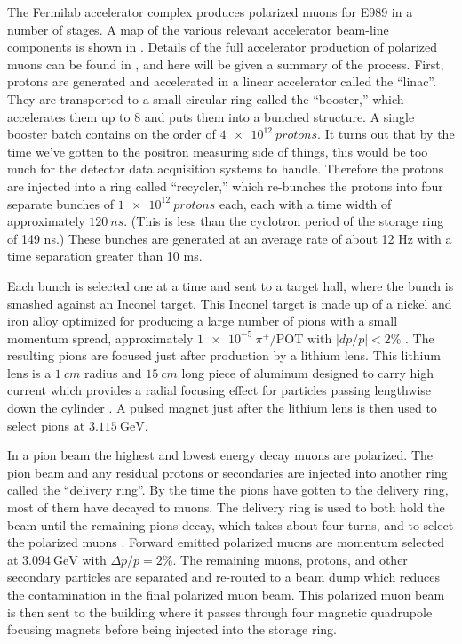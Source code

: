 The Fermilab accelerator complex produces polarized muons for E989 in a number of stages. A map of the various relevant accelerator beam-line components is shown in . Details of the full accelerator production of polarized muons can be found in , and here will be given a summary of the process. First, protons are generated and accelerated in a linear accelerator called the ``linac''. They are transported to a small circular ring called the ``booster,'' which accelerates them up to 8 \GeV and puts them into a bunched structure. A single booster batch contains on the order of $\SI{4e12}{protons}$. It turns out that by the time we've gotten to the positron measuring side of things, this would be too much for the detector data acquisition systems to handle. Therefore the protons are injected into a ring called ``recycler,'' which re-bunches the protons into four separate bunches of $\SI{1e12}{protons}$ each, each with a time width of approximately $\SI{120}{ns}$. (This is less than the cyclotron period of the storage ring of 149 ns.) These bunches are generated at an average rate of about 12 Hz with a time separation greater than 10 ms.

Each bunch is selected one at a time and sent to a target hall, where the bunch is smashed against an Inconel target. This Inconel target is made up of a nickel and iron alloy optimized for producing a large number of pions with a small momentum spread, approximately $\SI{1e-5}{\pi^{+}/\text{POT}}$ with $|dp/p| < 2 \%$ \cite{Stratakis:2017uci}. The resulting pions are focused just after production by a lithium lens. This lithium lens is a $\SI{1}{cm}$ radius and $\SI{15}{cm}$ long piece of aluminum designed to carry high current which provides a radial focusing effect for particles passing lengthwise down the cylinder \cite{LiLens}. A pulsed magnet just after the lithium lens is then used to select pions at $\SI{3.115}{\GeV}$.

In a pion beam the highest and lowest energy decay muons are polarized. The pion beam and any residual protons or secondaries are injected into another ring called the ``delivery ring''. By the time the pions have gotten to the delivery ring, most of them have decayed to muons. The delivery ring is used to both hold the beam until the remaining pions decay, which takes about four turns, and to select the polarized muons \cite{Stratakis:2017uci}. Forward emitted polarized muons are momentum selected at $\SI{3.094}{\GeV}$ with $\Delta p / p = 2\%$. The remaining muons, protons, and other secondary particles are separated and re-routed to a beam dump which reduces the contamination in the final polarized muon beam. This polarized muon beam is then sent to the \gmtwo building where it passes through four magnetic quadrupole focusing magnets before being injected into the storage ring.

